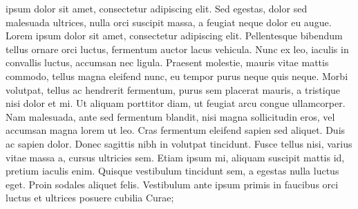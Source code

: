 \documentclass{article}
\begin{document}
\begin{pairs}\sloppy
\begin{Leftside}
    \beginnumbering
               \pstart
{} ipsum  dolor sit amet, consectetur adipiscing elit. Sed   egestas, dolor sed malesuada ultrices, nulla orci  suscipit massa, a feugiat neque dolor eu augue.  Lorem ipsum dolor sit amet, consectetur adipiscing  elit. Pellentesque bibendum  tellus ornare orci luctus, fermentum auctor lacus vehicula. Nunc ex leo, iaculis in  convallis  luctus, accumsan nec ligula. Praesent molestie, mauris vitae mattis commodo, tellus magna  eleifend nunc, eu tempor purus neque quis neque. Morbi volutpat, tellus ac hendrerit fermentum, purus sem placerat mauris, a tristique nisi dolor et mi. Ut aliquam porttitor diam, ut  feugiat arcu congue ullamcorper. Nam malesuada, ante sed fermentum blandit, nisi magna sollicitudin eros, vel accumsan magna lorem ut leo. Cras fermentum eleifend sapien sed aliquet. Duis ac sapien dolor. Donec sagittis nibh in volutpat tincidunt. Fusce tellus nisi, varius vitae massa a, cursus ultricies sem. Etiam ipsum mi, aliquam suscipit mattis id, pretium iaculis enim. Quisque vestibulum tincidunt sem, a egestas nulla  luctus eget. Proin sodales aliquet felis.  Vestibulum ante ipsum primis in faucibus orci luctus et  ultrices posuere cubilia Curae;

        \pend




\end{Leftside}
\end{pairs}
\end{document}

